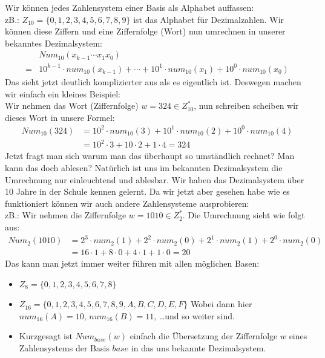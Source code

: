 \documentclass[12pt]{article}
\begin{document}
\begin{flushleft}
    Wir können jedes Zahlensystem einer Basis als Alphabet auffassen: \\
    zB.: $Z_{10} = \{0,1,2,3,4,5,6,7,8,9\}$ ist das Alphabet für Dezimalzahlen.
    Wir können diese Ziffern und eine Ziffernfolge (Wort) nun umrechnen in unserer bekanntes Dezimalsystem:
    \begin{align*}
        &Num_{10}(x_{k - 1} \cdots x_1x_0) \\
        =&10^{k-1} \cdot num_{10}(x_{k-1}) + \cdots + 10^1 \cdot num_{10}(x_1) + 10^0 \cdot num_{10}(x_0)
    \end{align*}
    Das sieht jetzt deutlich komplizierter aus als es eigentlich ist. Deswegen machen wir einfach ein kleines Beispiel: \\
    Wir nehmen das Wort (Ziffernfolge) $w = 324 \in Z_{10}^{\ast}$, nun schreiben scheiben wir dieses Wort in unsere Formel:
    \begin{align*}
        Num_{10}(324) &= 10^2 \cdot num_{10}(3) + 10^1 \cdot num_{10}(2) + 10^0 \cdot num_{10}(4) \\
        &= 10^2 \cdot 3 + 10 \cdot 2 + 1 \cdot 4 = 324
    \end{align*}
    Jetzt fragt man sich warum man das überhaupt so umständlich rechnet? Man kann das doch ablesen?
    Natürlich ist uns im bekannten Dezimalsystem die Umrechnung nur einleuchtend und ablesbar. Wir haben das Dezimalsystem über 10 Jahre in der Schule kennen gelernt.
    Da wir jetzt aber gesehen habe wie es funktioniert können wir auch andere Zahlensysteme ausprobieren: \\
    zB.: Wir nehmen die Ziffernfolge $w = 1010 \in Z_2^{\ast}$. Die Umrechnung sieht wie folgt aus:
    \begin{align*}
        Num_2(1010) &= 2^3 \cdot num_2(1) + 2^2 \cdot num_2(0) + 2^1 \cdot num_2(1) + 2^0 \cdot num_2(0) \\
        &= 16 \cdot 1 + 8 \cdot 0 + 4 \cdot 1 + 1 \cdot 0 = 20
    \end{align*}
    Das kann man jetzt immer weiter führen mit allen möglichen Basen:
    \begin{itemize}
        \item $Z_{8} = \{0,1,2,3,4,5,6,7,8\}$
        \item $Z_{16} = \{0,1,2,3,4,5,6,7,8,9,A,B,C,D,E,F\}$
        Wobei dann hier $num_{16}(A) = 10$, $num_{16}(B) = 11$, \dots und so weiter sind.
        \item Kurzgesagt ist $Num_{base}(w)$ einfach die Übersetzung der Ziffernfolge $w$ eines Zahlensystems der Basis $base$ in das uns bekannte Dezimalsystem.

\end{itemize}
\end{flushleft}
\end{document}
